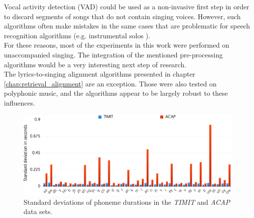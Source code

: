 \begin{description}
 Vocal activity detection (VAD) could be used as a non-invasive first step in order to discard segments of songs that do not contain singing voices. However, such algorithms often make mistakes in the same cases that are problematic for speech recognition algorithms (e.g. instrumental solos \cite{schlueter2016_ismir}).\\
 For these reasons, most of the experiments in this work were performed on unaccompanied singing. The integration of the mentioned pre-processing algorithms would be a very interesting next step of research.\\
The lyrics-to-singing alignment algorithms presented in chapter \ref{chap:retrieval_alignment} are an exception. Those were also tested on polyphonic music, and the algorithms appear to be largely robust to these influences.
 \end{description}

\begin{figure}
	\begin{center}
		\includegraphics[width=1\textwidth]{images/phoneme_stats.png}
		\caption{Standard deviations of phoneme durations in the \textit{TIMIT} and \textit{ACAP} data sets.}
		\label{fig:phoneme_stats}
	\end{center}
\end{figure}


